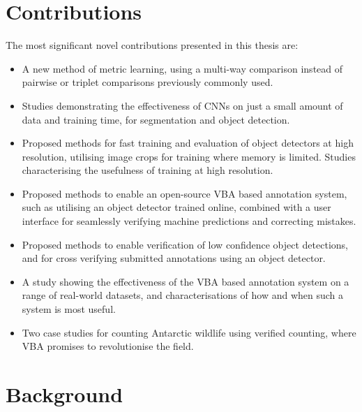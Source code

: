 \section {Contributions}
\label{sec: contributions}

The most significant novel contributions presented in this thesis are:

\begin{itemize}

    \item A new method of metric learning, using a multi-way comparison instead of pairwise or triplet comparisons previously commonly used.
    
    \item Studies demonstrating the effectiveness of \gls{CNN}s on just a small amount of data and training time, for segmentation and object detection.
    
    \item Proposed methods for fast training and evaluation of object detectors at high resolution, utilising image crops for training where memory is limited. Studies characterising the usefulness of training at high resolution.    
    
    \item Proposed methods to enable an open-source \gls{VBA} based annotation system, such as utilising an object detector trained online, combined with a user interface for seamlessly verifying machine predictions and correcting mistakes.
    
    \item Proposed methods to enable verification of low confidence object detections, and for cross verifying submitted annotations using an object detector.
    
    \item A study showing the effectiveness of the \gls{VBA} based annotation system on a range of real-world datasets, and characterisations of how and when such a system is most useful.
    
    \item Two case studies for counting Antarctic wildlife using verified counting, where \gls{VBA} promises to revolutionise the field. 
    
\end{itemize}

\section {Background}

